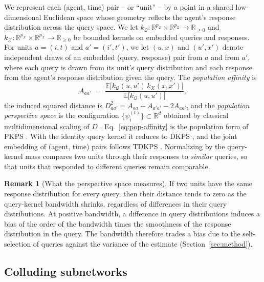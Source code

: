 \documentclass{article}
\theoremstyle{plain}
\theoremstyle{definition}
\newtheorem{remark}{Remark}
\newcommand{\Q}{\mathcal{Q}}
\newcommand{\X}{\mathcal{X}}
\newcommand{\R}{\mathbb{R}}
\newcommand{\E}{\mathbb{E}}
\begin{document}
We represent each (agent, time) pair -- or ``unit'' -- by a point in a shared low-dimensional Euclidean space whose geometry reflects the agent's response distribution across the query space. We let $k_\Q:\R^{p_\Q}\times\R^{p_\Q}\to\R_{\ge 0}$ and $k_\X:\R^{p_\X}\times\R^{p_\X}\to\R_{\ge 0}$ be bounded kernels on embedded queries and responses. For units $a=(i,t)$ and $a'=(i',t')$, we let $(u,x)$ and $(u',x')$ denote independent draws of an embedded (query, response) pair from $a$ and from $a'$, where each query is drawn from its unit's query distribution and each response from the agent's response distribution given the query. The \emph{population affinity} is
\begin{equation}
\label{eq:pop-affinity}
A_{aa'} \;=\; \frac{\E\big[k_\Q(u,u')\,k_\X(x,x')\big]}{\E\big[k_\Q(u,u')\big]},
\end{equation}
the induced squared distance is $D^2_{aa'} = A_{aa} + A_{a'a'} - 2A_{aa'}$, and the \emph{population perspective space} is the configuration $\{\psi_i^{(t)}\}\subset\R^d$ obtained by classical multidimensional scaling of $D$ \citep{torgerson1952multidimensional,trosset2024continuous}. Eq.~\eqref{eq:pop-affinity} is the population form of PKPS \citep{pkps2026}. With the identity query kernel it reduces to DKPS \citep{helm2024tracking,helm2025statistical}, and the joint embedding of (agent, time) pairs follows TDKPS \citep{bridgeford2025detecting}. Normalizing by the query-kernel mass compares two units through their responses to \emph{similar} queries, so that units that responded to different queries remain comparable.

\begin{remark}[What the perspective space measures]
If two units have the same response distribution for every query, then their distance tends to zero as the query-kernel bandwidth shrinks, regardless of differences in their query distributions. At positive bandwidth, a difference in query distributions induces a bias of the order of the bandwidth times the smoothness of the response distribution in the query. The bandwidth therefore trades a bias due to the self-selection of queries against the variance of the estimate (Section~\ref{sec:method}).
\end{remark}

\subsection{Colluding subnetworks}
\label{sec:collusion}
\end{document}

